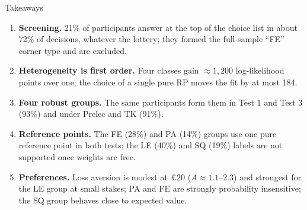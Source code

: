 \documentclass[aspectratio=169,11pt]{beamer}
\newcommand{\tight}{\setlength{\itemsep}{3pt}}
\begin{document}
\begin{frame}{Takeaways}
\begin{enumerate}\tight
  \item \textbf{Screening.} 21\% of participants answer at the top of the choice list in about 72\% of decisions, whatever the lottery; they formed the full-sample ``FE'' corner type and are excluded.
  \item \textbf{Heterogeneity is first order.} Four classes gain $\approx 1{,}200$ log-likelihood points over one; the choice of a single pure RP moves the fit by at most 184.
  \item \textbf{Four robust groups.} The same participants form them in Test 1 and Test 3 (93\%) and under Prelec and TK (91\%).
  \item \textbf{Reference points.} The FE (28\%) and PA (14\%) groups use one pure reference point in both tests; the LE (40\%) and SQ (19\%) labels are not supported once weights are free.
  \item \textbf{Preferences.} Loss aversion is modest at \pounds 20 ($A\approx 1.1$--$2.3$) and strongest for the LE group at small stakes; PA and FE are strongly probability insensitive; the SQ group behaves close to expected value.
\end{enumerate}
\end{frame}

\appendix
\end{document}
